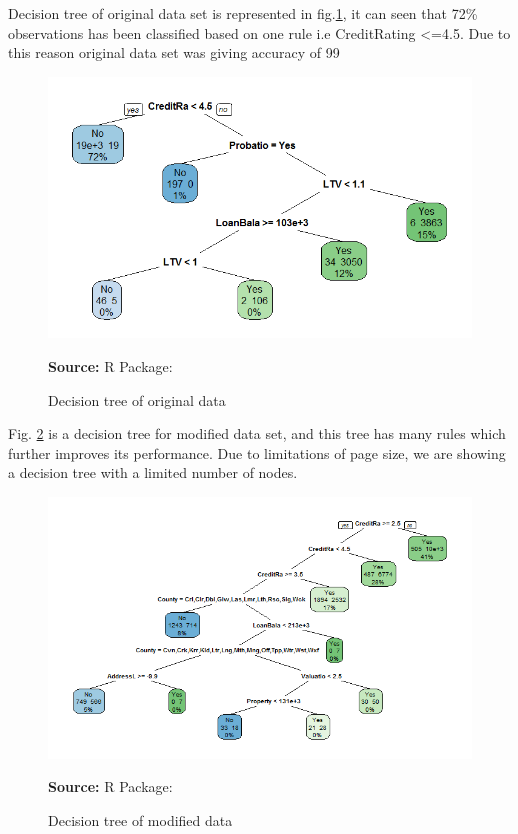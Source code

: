 Decision tree of original data set is represented in fig.\ref{fig:DTorg}, it can seen that 72\% observations has been classified based on one rule i.e CreditRating <=4.5. Due to this reason original data set was giving accuracy of 99%

\begin{center}
\begin{figure}[!htb]
\includegraphics[width=\textwidth]{DTorg.png}
\centering
\caption{Decision tree of original data}{\textbf{Source:} R Package:\citep{rpart.plotpackage}}
\label{fig:DTorg}
\end{figure}
\end{center}

Fig. \ref{fig:DTmod} is a decision tree for modified data set, and this tree has many rules which further improves its performance. Due to limitations of page size, we are showing a decision tree with a limited number of nodes.

\begin{center}
\begin{figure}[!htb]
\includegraphics[width=\textwidth]{DTmod.png}
\centering
\caption{Decision tree of modified data}{\textbf{Source:} R Package: \citep{rpart.plotpackage}}
\label{fig:DTmod}
\end{figure}
\end{center}




